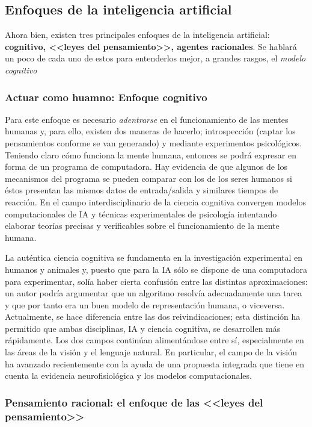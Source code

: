 \documentclass{article}
\begin{document}
\subsection{Enfoques de la inteligencia artificial}

Ahora bien, existen tres principales enfoques de la inteligencia artificial: \textbf{cognitivo, <<leyes del pensamiento>>, agentes racionales}. Se hablará un poco de cada uno de estos para entenderlos mejor, a grandes rasgos, el \textit{modelo cognitivo} 

\subsubsection{Actuar como huamno: Enfoque cognitivo}

Para este enfoque es necesario \textit{adentrarse} en el funcionamiento de las mentes humanas y, para ello, existen dos maneras de hacerlo; introspección (captar los pensamientos conforme se van generando) y mediante experimentos psicológicos. Teniendo claro cómo funciona la mente humana, entonces se podrá expresar en forma de un programa de computadora. Hay evidencia de que algunos de los mecanismos del programa se pueden comparar con los de los seres humanos si éstos presentan las mismos datos de entrada/salida y similares tiempos de reacción. En el campo interdisciplinario de la ciencia cognitiva convergen modelos computacionales de IA y técnicas experimentales de psicología intentando elaborar teorías precisas y verificables sobre el funcionamiento de la mente humana.

La auténtica ciencia cognitiva se fundamenta en la investigación experimental en humanos y animales y, puesto que para la IA sólo se dispone de una computadora para experimentar, solía haber cierta confusión entre las distintas aproximaciones:  un autor podría argumentar que un algoritmo resolvía adecuadamente una tarea y que por tanto era un buen modelo de representación humana, o viceversa. Actualmente, se hace diferencia entre las dos reivindicaciones; esta distinción ha permitido que ambas disciplinas, IA y ciencia cognitiva, se desarrollen más rápidamente. Los dos campos continúan alimentándose entre sí, especialmente en las áreas de la visión y el lenguaje natural. En particular, el campo de la visión ha avanzado recientemente con la ayuda de una propuesta integrada que tiene en cuenta la evidencia neurofisiológica y los modelos computacionales.

\subsubsection{Pensamiento racional: el enfoque de las <<leyes del pensamiento>>}
\end{document}
